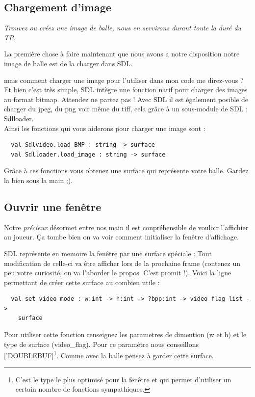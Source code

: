 \documentclass[a4paper]{article}
\begin{document}
\subsection{Chargement d'image}
\textit{Trouvez ou créez une image de balle, nous en servirons durant toute la duré du TP.}\par\bigskip

La première chose à faire maintenant que nous avons a notre disposition notre image de balle est de la charger dans SDL.\par
mais comment charger une image pour l'utiliser dans mon code me direz-vous ?
Et bien c'est très simple, SDL intègre une fonction natif pour charger des images au format bitmap. Attendez ne partez pas ! Avec SDL il est également posible de charger du jpeg, du png voir même du tiff, cela grâce à un sous-module de SDL : Sdlloader.\\\smallskip
Ainsi les fonctions qui vous aiderons pour charger une image sont :

\begin{lstlisting}
  val Sdlvideo.load_BMP : string -> surface
  val Sdlloader.load_image : string -> surface
\end{lstlisting}

Grâce à ces fonctions vous obtenez une surface qui représente votre balle. Gardez la bien sous la main ;).

\subsection{Ouvrir une fenêtre}
Notre \textit{précieux} désormet entre nos main il est conpréhensible de vouloir l'affichier au joueur. Ça tombe bien on va voir comment initialiser la fenêtre d'affichage.

SDL représente en memoire la fenêtre par une surface spéciale : Tout modification de celle-ci va être afficher lors de la prochaine frame (contenez un peu votre curiosité, on va l'aborder le propos. C'est promit !). Voici la ligne permettant de créer cette surface au combien utile :

\begin{lstlisting}
  val set_video_mode : w:int -> h:int -> ?bpp:int -> video_flag list -> 
    surface
\end{lstlisting}

Pour utiliser cette fonction renseignez les parametres de dimention (w et h) et le type de surface (video\_flag). Pour ce paramètre nous conseillons ['DOUBLEBUF]\footnote{C'est le type le plus optimisé pour la fenêtre et qui permet d'utiliser un certain nombre de fonctions sympathiques.}. Comme avec la balle pensez à garder cette surface.
\end{document}

